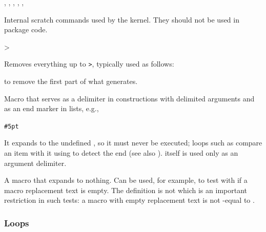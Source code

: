 \documentclass{l3in2edoc}
\begin{document}
\begin{function}[int]
  {
    \reserved@a,
    \reserved@b,
    \reserved@c,
    \reserved@d,
    \reserved@e,
    \reserved@f
  }

  Internal scratch commands used by the kernel. They should not be
  used in package code.
\end{function}




\begin{function}[]
  {
    \strip@prefix
  }
  \begin{syntax}
      >
  \end{syntax}
  Removes everything up to \texttt{>}, typically used as follows:
  \begin{alltt}
       
  \end{alltt}
  to remove the first part of what  generates.
\end{function}


\begin{function}[]
  {
    \@nnil
  }
%
  Macro that serves as a delimiter in constructions with delimited
  arguments and as an end marker in lists, e.g.,
  \begin{alltt}
     \#5pt
  \end{alltt}
  It expands to the undefined , so it must never be
  executed; loops such as  compare an item with it using
   to detect the end (see also ). 
  itself is used only as an argument delimiter.
\end{function}


\begin{function}[]
  {
    \@empty
  }
%
  A macro that expands to nothing. Can be used, for example, to test
  with  if a macro replacement text is empty. The definition
  is not  which is an important restriction in such tests: a
   macro with empty replacement text is not -equal to
  .
\end{function}





\subsubsection{Loops}
\end{document}
